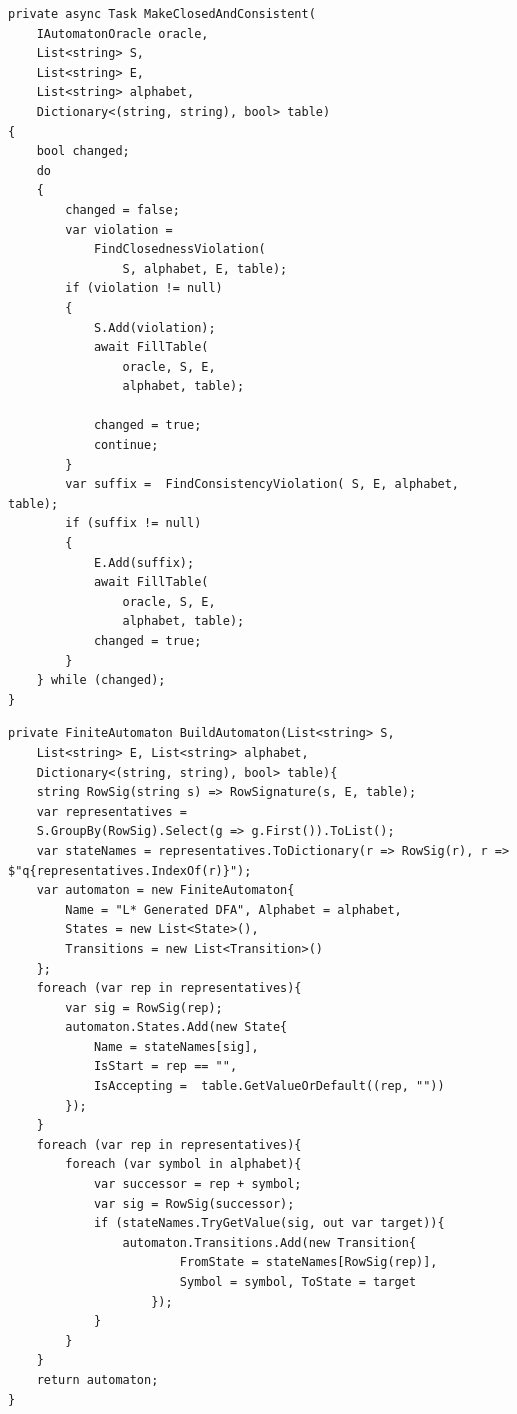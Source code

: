 \documentclass[12pt]{article}
\begin{document}
\clearpage

\begin{lstlisting}[language={[Sharp]C},
caption={Sprawdzanie domknięcia i spójności tabeli obserwacji},
label={lst:lstar-refinement}]
private async Task MakeClosedAndConsistent(
    IAutomatonOracle oracle,
    List<string> S,
    List<string> E,
    List<string> alphabet,
    Dictionary<(string, string), bool> table)
{
    bool changed;
    do
    {
        changed = false;
        var violation =
            FindClosednessViolation(
                S, alphabet, E, table);
        if (violation != null)
        {
            S.Add(violation);
            await FillTable(
                oracle, S, E,
                alphabet, table);

            changed = true;
            continue;
        }
        var suffix =  FindConsistencyViolation( S, E, alphabet, table);
        if (suffix != null)
        {
            E.Add(suffix);
            await FillTable(
                oracle, S, E,
                alphabet, table);
            changed = true;
        }
    } while (changed);
}
\end{lstlisting}



\clearpage
\begin{lstlisting}[language={[Sharp]C},
caption={Konstrukcja automatu DFA na podstawie tabeli obserwacji},
label={lst:lstar-build}]
private FiniteAutomaton BuildAutomaton(List<string> S, 
    List<string> E, List<string> alphabet, 
    Dictionary<(string, string), bool> table){
    string RowSig(string s) => RowSignature(s, E, table);
    var representatives = 
    S.GroupBy(RowSig).Select(g => g.First()).ToList();
    var stateNames = representatives.ToDictionary(r => RowSig(r), r => $"q{representatives.IndexOf(r)}");
    var automaton = new FiniteAutomaton{
        Name = "L* Generated DFA", Alphabet = alphabet,
        States = new List<State>(), 
        Transitions = new List<Transition>()
    };
    foreach (var rep in representatives){
        var sig = RowSig(rep);
        automaton.States.Add(new State{
            Name = stateNames[sig],
            IsStart = rep == "", 
            IsAccepting =  table.GetValueOrDefault((rep, ""))
        });
    }
    foreach (var rep in representatives){
        foreach (var symbol in alphabet){
            var successor = rep + symbol;
            var sig = RowSig(successor);
            if (stateNames.TryGetValue(sig, out var target)){
                automaton.Transitions.Add(new Transition{
                        FromState = stateNames[RowSig(rep)],
                        Symbol = symbol, ToState = target
                    });
            }
        }
    }
    return automaton;
}
\end{lstlisting}
\end{document}
